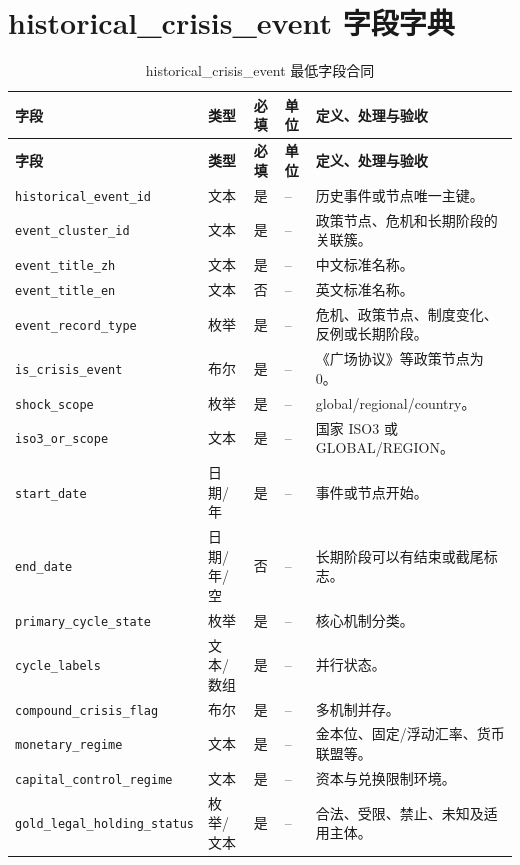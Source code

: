 \documentclass[UTF8,fontset=windows,12pt,openany]{ctexbook}
\newcommand{\Field}[1]{{\small\nolinkurl{#1}}}
\begin{document}
\chapter{historical\_crisis\_event 字段字典}
\clearpage
\begin{landscape}

\begin{longtable}{p{4.0cm}p{2.0cm}p{2.2cm}p{2.8cm}p{7.3cm}}
\caption{historical\_crisis\_event 最低字段合同}\label{tab:dict-historical-event}\\
\toprule
\textbf{字段} & \textbf{类型} & \textbf{必填} & \textbf{单位} & \textbf{定义、处理与验收}\\
\midrule
\endfirsthead
\toprule \textbf{字段} & \textbf{类型} & \textbf{必填} & \textbf{单位} & \textbf{定义、处理与验收}\\ \midrule
\endhead
\Field{historical_event_id} & 文本 & 是 & -- & 历史事件或节点唯一主键。\\
\Field{event_cluster_id} & 文本 & 是 & -- & 政策节点、危机和长期阶段的关联簇。\\
\Field{event_title_zh} & 文本 & 是 & -- & 中文标准名称。\\
\Field{event_title_en} & 文本 & 否 & -- & 英文标准名称。\\
\Field{event_record_type} & 枚举 & 是 & -- & 危机、政策节点、制度变化、反例或长期阶段。\\
\Field{is_crisis_event} & 布尔 & 是 & -- & 《广场协议》等政策节点为 0。\\
\Field{shock_scope} & 枚举 & 是 & -- & global/regional/country。\\
\Field{iso3_or_scope} & 文本 & 是 & -- & 国家 ISO3 或 GLOBAL/REGION。\\
\Field{start_date} & 日期/年 & 是 & -- & 事件或节点开始。\\
\Field{end_date} & 日期/年/空 & 否 & -- & 长期阶段可以有结束或截尾标志。\\
\Field{primary_cycle_state} & 枚举 & 是 & -- & 核心机制分类。\\
\Field{cycle_labels} & 文本/数组 & 是 & -- & 并行状态。\\
\Field{compound_crisis_flag} & 布尔 & 是 & -- & 多机制并存。\\
\Field{monetary_regime} & 文本 & 是 & -- & 金本位、固定/浮动汇率、货币联盟等。\\
\Field{capital_control_regime} & 文本 & 是 & -- & 资本与兑换限制环境。\\
\Field{gold_legal_holding_status} & 枚举/文本 & 是 & -- & 合法、受限、禁止、未知及适用主体。\\

\end{longtable}
\end{landscape}
\end{document}
